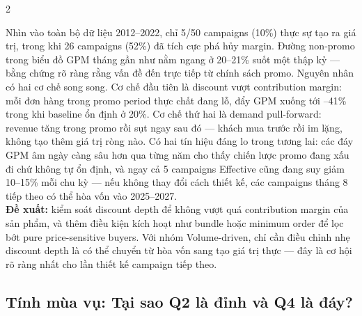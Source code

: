 \documentclass{article}
\begin{document}
\begin{multicols}{2}
\begin{center}
\begin{minipage}{\linewidth}
{        }
    \end{minipage}
\end{center}
Nhìn vào toàn bộ dữ liệu 2012–2022, chỉ 5/50 campaigns (10\%) thực sự tạo ra giá trị, trong khi 26 campaigns (52\%) đã tích cực phá hủy margin. Đường non-promo trong biểu đồ GPM tháng gần như nằm ngang ở 20–21\% suốt một thập kỷ — bằng chứng rõ ràng rằng vấn đề đến trực tiếp từ chính sách promo.
Nguyên nhân có hai cơ chế song song. Cơ chế đầu tiên là discount vượt contribution margin: mỗi đơn hàng trong promo period thực chất đang lỗ, đẩy GPM xuống tới –41\% trong khi baseline ổn định ở 20\%. Cơ chế thứ hai là demand pull-forward: revenue tăng trong promo rồi sụt ngay sau đó — khách mua trước rồi im lặng, không tạo thêm giá trị ròng nào.
Có hai tín hiệu đáng lo trong tương lai: các đáy GPM âm ngày càng sâu hơn qua từng năm cho thấy chiến lược promo đang xấu đi chứ không tự ổn định, và ngay cả 5 campaigns Effective cũng đang suy giảm 10–15\% mỗi chu kỳ — nếu không thay đổi cách thiết kế, các campaigns tháng 8 tiếp theo có thể hòa vốn vào 2025–2027. \\
\textbf{Đề xuất:} kiểm soát discount depth để không vượt quá contribution margin của sản phẩm, và thêm điều kiện kích hoạt như bundle hoặc minimum order để lọc bớt pure price-sensitive buyers. Với nhóm Volume-driven, chỉ cần điều chỉnh nhẹ discount depth là có thể chuyển từ hòa vốn sang tạo giá trị thực — đây là cơ hội rõ ràng nhất cho lần thiết kế campaign tiếp theo.
\subsection{Tính mùa vụ: Tại sao Q2 là đỉnh và Q4 là đáy?}


\end{multicols}
\end{document}
